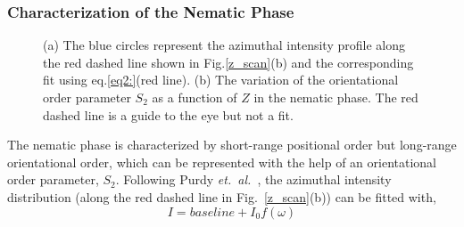 \documentclass[aps,prl,preprint,superscriptaddress,showkeys]{revtex4-2} %
\begin{document}
\subsubsection{Characterization of the Nematic Phase}
\begin{figure}[ht]
\caption{(a) The blue circles represent the azimuthal intensity profile along the red dashed line shown in Fig.\ref{z_scan}(b) and the corresponding fit using eq.\ref{eq2:}(red line). (b) The variation of the orientational order parameter $S_2$ as a function of $Z$ in the nematic phase. The red dashed line is a guide to the eye but not a fit.}\label{order_param}
\end{figure} 
The nematic phase is characterized by short-range positional order but long-range orientational order, which can be represented with the help of an orientational order parameter, $S_2$. Following Purdy \emph{et.~al.}~\cite{purdy2003measuring, kleshchanok2010structures}, the azimuthal intensity distribution (along the red dashed line in Fig.~\ref{z_scan}(b)) can be fitted with,
\begin{equation}
\label{eq2:}
I= baseline +  I_0 f(\omega)
\end{equation} 
\end{document}
